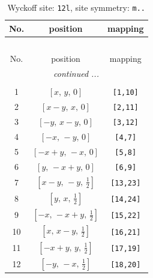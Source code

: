 \documentclass[fleqn,8pt]{jsarticle}
\begin{document}
\begin{longtable}{ccc}
\caption{Wyckoff site: {\tt 12l}, site symmetry: {\tt m..}}
 \\
 \hline \hline
No. & position & mapping \\ \hline \endfirsthead

\multicolumn{2}{l}{\tablename\ \thetable{}} \\
 \hline \hline
No. & position & mapping \\ \hline \endhead

 \hline \hline
\multicolumn{2}{r}{\footnotesize\it continued ...} \\ \endfoot

 \hline \hline
\multicolumn{2}{r}{} \\ \endlastfoot

1 & $\left[ x,\, y,\, 0 \right]$ & {\tt [1,10]} \\ \hline
2 & $\left[ x - y,\, x,\, 0 \right]$ & {\tt [2,11]} \\ \hline
3 & $\left[ - y,\, x - y,\, 0 \right]$ & {\tt [3,12]} \\ \hline
4 & $\left[ - x,\, - y,\, 0 \right]$ & {\tt [4,7]} \\ \hline
5 & $\left[ - x + y,\, - x,\, 0 \right]$ & {\tt [5,8]} \\ \hline
6 & $\left[ y,\, - x + y,\, 0 \right]$ & {\tt [6,9]} \\ \hline
7 & $\left[ x - y,\, - y,\, \frac{1}{2} \right]$ & {\tt [13,23]} \\ \hline
8 & $\left[ y,\, x,\, \frac{1}{2} \right]$ & {\tt [14,24]} \\ \hline
9 & $\left[ - x,\, - x + y,\, \frac{1}{2} \right]$ & {\tt [15,22]} \\ \hline
10 & $\left[ x,\, x - y,\, \frac{1}{2} \right]$ & {\tt [16,21]} \\ \hline
11 & $\left[ - x + y,\, y,\, \frac{1}{2} \right]$ & {\tt [17,19]} \\ \hline
12 & $\left[ - y,\, - x,\, \frac{1}{2} \right]$ & {\tt [18,20]} \\
\end{longtable}
\renewcommand{\arraystretch}{1.2}
\end{document}

